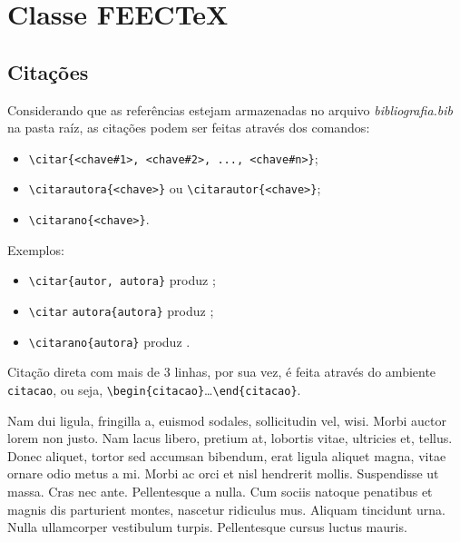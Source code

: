\chapter{Classe FEECTeX}
\label{cap1}

\section{Citações}

Considerando que as referências estejam armazenadas no arquivo \textit{bibliografia.bib} na pasta raíz, as citações podem ser feitas através dos comandos:

\begin{itemize}
    \item \verb|\citar{<chave#1>, <chave#2>, ..., <chave#n>}|;
    \item \verb|\citarautora{<chave>}| ou \verb|\citarautor{<chave>}|;
    \item \verb|\citarano{<chave>}|.
\end{itemize}

Exemplos:

\begin{itemize}
    \item \verb|\citar{autor, autora}| produz ;
    \item \verb|\citar| \verb|autora{autora}| produz ;
    \item \verb|\citarano{autora}| produz .
\end{itemize}

Citação direta com mais de 3 linhas, por sua vez, é feita através do ambiente \verb|citacao|, ou seja, \verb|\begin{citacao}|\dots\verb|\end{citacao}|.

\begin{citacao}
    Nam dui ligula, fringilla a, euismod sodales, sollicitudin vel, wisi. Morbi auctor lorem non justo. Nam lacus libero, pretium at, lobortis vitae, ultricies et, tellus. Donec aliquet, tortor sed accumsan bibendum, erat ligula aliquet magna, vitae ornare odio metus a mi. Morbi ac orci et nisl hendrerit mollis. Suspendisse ut massa. Cras nec ante. Pellentesque a nulla. Cum sociis natoque penatibus et magnis dis parturient montes, nascetur ridiculus mus. Aliquam tincidunt urna. Nulla ullamcorper vestibulum turpis. Pellentesque cursus luctus mauris.
\end{citacao}

